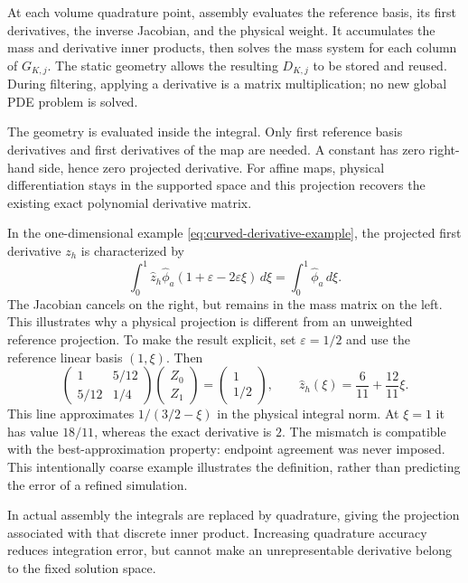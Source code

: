 At each volume quadrature point, assembly evaluates the reference basis,
its first derivatives, the inverse Jacobian, and the physical weight. It
accumulates the mass and derivative inner products, then solves the mass
system for each column of $G_{K,j}$. The static geometry allows the resulting
$D_{K,j}$ to be stored and reused. During filtering, applying a derivative is
a matrix multiplication; no new global PDE problem is solved.

The geometry is evaluated inside the integral. Only first reference
basis derivatives and first derivatives of the map are needed. A constant
has zero right-hand side, hence zero projected derivative. For affine maps,
physical differentiation stays in the supported space and this projection
recovers the existing exact polynomial derivative matrix.

In the one-dimensional example \cref{eq:curved-derivative-example}, the
projected first derivative $z_h$ is characterized by
\begin{equation}
 \int_0^1\widehat z_h\widehat\phi_a
       (1+\varepsilon-2\varepsilon\xi)\,d\xi
 =\int_0^1\widehat\phi_a\,d\xi.
\end{equation}
The Jacobian cancels on the right, but remains in the mass matrix on the left.
This illustrates why a physical projection is different from an unweighted
reference projection. To make the result explicit, set $\varepsilon=1/2$
and use the reference linear basis $(1,\xi)$. Then
\begin{equation}
 \begin{pmatrix}1&5/12\\5/12&1/4\end{pmatrix}
 \begin{pmatrix}Z_0\\Z_1\end{pmatrix}
 =\begin{pmatrix}1\\1/2\end{pmatrix},
 \qquad
 \widehat z_h(\xi)=\frac6{11}+\frac{12}{11}\xi.
 \label{eq:curved-projection-worked-example}
\end{equation}
This line approximates $1/(3/2-\xi)$ in the physical integral norm.
At $\xi=1$ it has value $18/11$, whereas the exact derivative is $2$.
The mismatch is compatible with the best-approximation property: endpoint
agreement was never imposed. This intentionally coarse example illustrates
the definition, rather than predicting the error of a refined simulation.

In actual assembly the integrals are replaced by quadrature, giving the
projection associated with that discrete inner product. Increasing
quadrature accuracy reduces integration error, but cannot make an
unrepresentable derivative belong to the fixed solution space.

